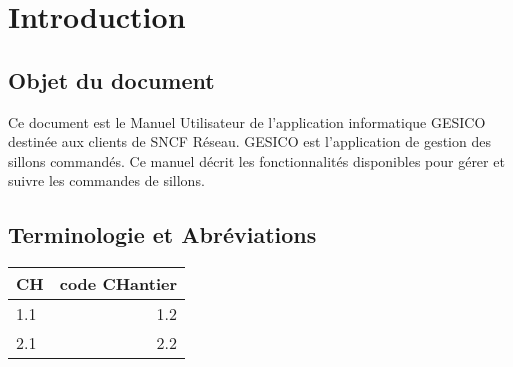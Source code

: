 \documentclass[a4paper]{report}
\begin{document}
\chapter{Introduction}
\section{Objet du document}
Ce document est le Manuel Utilisateur de l’application informatique GESICO destinée aux clients de SNCF Réseau. GESICO est l’application de gestion des sillons commandés. Ce manuel décrit les fonctionnalités disponibles pour gérer et suivre les commandes de sillons.

\section{Terminologie et Abréviations}	
\begin{tabular}{|l|r|}
	\hline
	CH & code \textbf{CH}antier \\
	\hline
	1.1 & 1.2 \\
	\hline
	2.1 & 2.2 \\
	\hline
\end{tabular}
\end{document}
